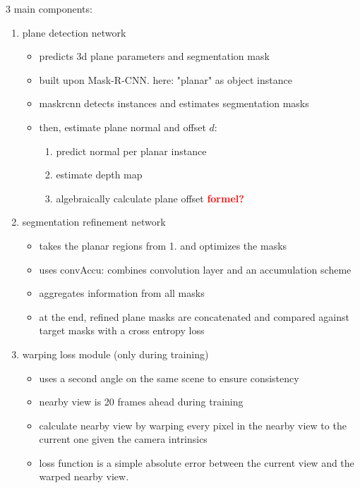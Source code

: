 \documentclass[main.tex]{subfiles}
\begin{document}
3 main components:
\begin{enumerate}
    \item plane detection network
    \begin{itemize}
        \item predicts 3d plane parameters and segmentation mask
        \item built upon Mask-R-CNN. here: "planar" as object instance
        \item maskrcnn detects instances and estimates segmentation masks
        \item then, estimate plane normal and offset $d$:
        \begin{enumerate}
            \item predict normal per planar instance
            \item estimate depth map
            \item algebraically calculate plane offset \textbf{\textcolor{red}{formel?}}
        \end{enumerate}
    \end{itemize}
    \item segmentation refinement network
    \begin{itemize}
        \item takes the planar regions from 1. and optimizes the masks
        \item uses convAccu: combines convolution layer and an accumulation scheme
        \item aggregates information from all masks
        \item at the end, refined plane masks are concatenated and compared against target 
        masks with a cross entropy loss
    \end{itemize}
    \item warping loss module (only during training)
    \begin{itemize}
        \item uses a second angle on the same scene to ensure consistency
        \item nearby view is 20 frames ahead during training
        \item calculate nearby view by warping every pixel in the nearby view to the current one 
        given the camera intrinsics
        \item loss function is a simple absolute error between the current view and the 
        warped nearby view. 
    \end{itemize}
\end{enumerate}
\end{document}
